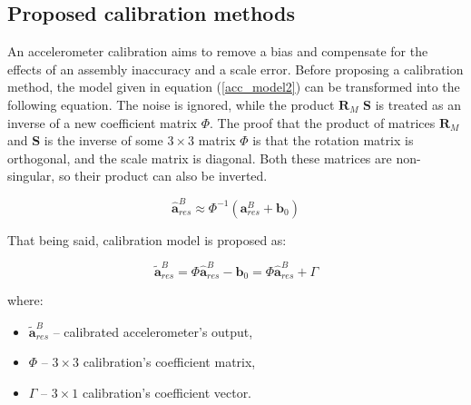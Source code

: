 \subsection{Proposed calibration methods}

An accelerometer calibration aims to remove a bias and compensate for the effects of an assembly inaccuracy and a scale error. Before proposing a calibration method, the model given in equation (\ref{acc_model2}) can be transformed into the following equation. The noise is ignored, while the product $\bm{R}_M$ $\bm{S}$ is treated as an inverse of a new coefficient matrix $\bm{\varPhi}$. The proof that the product of matrices $\bm{R}_M$ and $\bm{S}$ is the inverse of some $3 \times 3$ matrix $\bm{\varPhi}$ is that the rotation matrix is orthogonal, and the scale matrix is diagonal. Both these matrices are non-singular, so their product can also be inverted.

\begin{equation}
	\bm{\hat{a}}_{res}^B \approx \bm{\varPhi}^{-1} \left( \bm{a}_{res}^B + \bm{b}_0 \right)
	\label{acc_calib}
\end{equation}

That being said, calibration model is proposed as:

\begin{equation}
	\bm{\tilde{a}}_{res}^B = \bm{\varPhi} \bm{\hat{a}}_{res}^B - \bm{b}_0 = \bm{\varPhi} \bm{\hat{a}}_{res}^B + \bm{\varGamma}
	\label{acc_calib2}
\end{equation}

where:
\begin{itemize}
	\item $\bm{\tilde{a}}_{res}^B$ -- calibrated accelerometer's output,
	\item $\bm{\varPhi}$ -- $3 \times 3$ calibration's coefficient matrix,
	\item $\bm{\varGamma}$ -- $3 \times 1$ calibration's coefficient vector.
\end{itemize}

